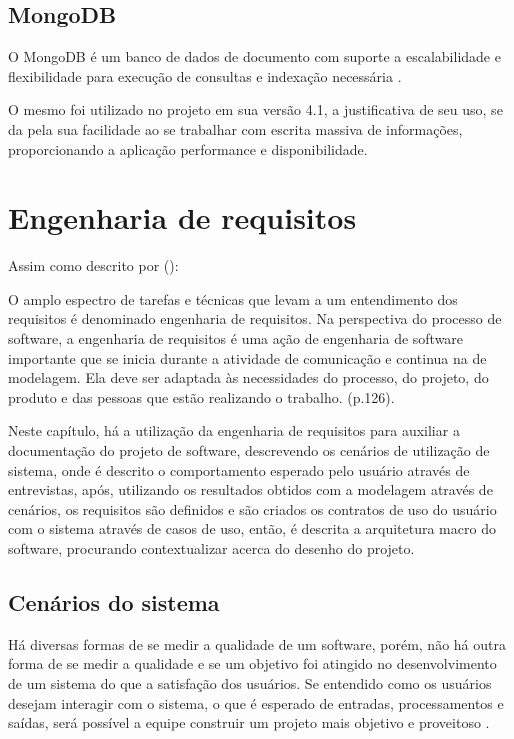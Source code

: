 \subsection{MongoDB}

O MongoDB é um banco de dados de documento com suporte a escalabilidade e flexibilidade para execução de consultas e indexação necessária \cite{what_mongodb}.

O mesmo foi utilizado no projeto em sua versão 4.1, a justificativa de seu uso, se da pela sua facilidade ao se trabalhar com escrita massiva de informações, proporcionando a aplicação performance e disponibilidade.

\section{Engenharia de requisitos}

Assim como descrito por  (\citeyear{engenharia_software_pressman}):

\begin{citacao}
O amplo espectro de tarefas e técnicas que levam a um entendimento dos requisitos é denominado engenharia de requisitos. Na perspectiva do processo de software, a engenharia de requisitos é uma ação de engenharia de software importante que se inicia durante a atividade de comunicação e continua na de modelagem. Ela deve ser adaptada às necessidades do processo, do projeto, do produto e das pessoas que estão realizando o trabalho. (p.126).
\end{citacao}

Neste capítulo, há a utilização da engenharia de requisitos para auxiliar a documentação do projeto de software, descrevendo os cenários de utilização de sistema, onde é descrito o comportamento esperado pelo usuário através de entrevistas, após, utilizando os resultados obtidos com a modelagem através de cenários, os requisitos são definidos e são criados os contratos de uso do usuário com o sistema através de casos de uso, então, é descrita a arquitetura macro do software, procurando contextualizar acerca do desenho do projeto.

\subsection{Cenários do sistema}

Há diversas formas de se medir a qualidade de um software, porém, não há outra forma de se medir a qualidade e se um objetivo foi atingido no desenvolvimento de um sistema do que a satisfação dos usuários. Se entendido como os usuários desejam interagir com o sistema, o que é esperado de entradas, processamentos e saídas, será possível a equipe construir um projeto mais objetivo e proveitoso \cite{engenharia_software_pressman}. 

